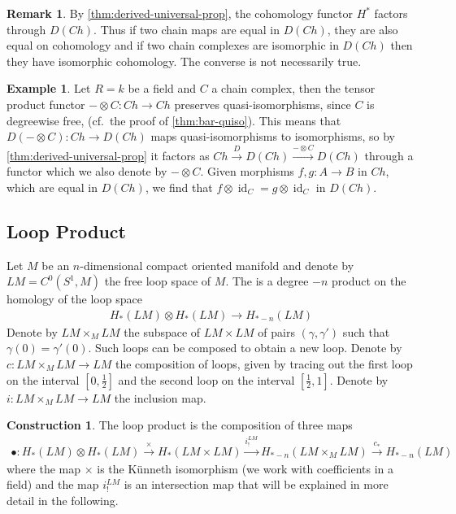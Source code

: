 \documentclass{scrartcl}
\let\emph\relax
\newcommand{\emphi}[1]{\index{#1}\emph{#1}}
\theoremstyle{plain}
\theoremstyle{definition}
\newtheorem{example}[theorem]{Example}
\newtheorem{remark}[theorem]{Remark}
\newtheorem{construction}[theorem]{Construction}
\let\xto\xrightarrow
\DeclareMathOperator{\id}{id}
\newcommand{\blank}{-}
\begin{document}
\begin{remark}
    By \cref{thm:derived-universal-prop}, the cohomology functor $H^*$ factors through $D(Ch)$. Thus if two chain maps are equal in $D(Ch)$, they are also equal on cohomology and if two chain complexes are isomorphic in $D(Ch)$ then they have isomorphic cohomology. The converse is not necessarily true.
\end{remark}

\begin{example}
    Let $R=k$ be a field and $C$ a chain complex, then the tensor product functor $\blank\otimes C\colon Ch\to Ch$ preserves quasi-isomorphisms, since $C$ is degreewise free, (cf.\ the proof of \cref{thm:bar-quiso}). This means that $D(\blank\otimes C)\colon Ch\to D(Ch)$ maps quasi-isomorphisms to isomorphisms, so by \cref{thm:derived-universal-prop} it factors as $Ch \xto{D} D(Ch)\xto{\blank\otimes C} D(Ch)$ through a functor which we also denote by $\blank\otimes C$. Given morphisms $f, g\colon A\to B$ in $Ch$, which are equal in $D(Ch)$, we find that $f\otimes \id_C = g\otimes\id_C$ in $D(Ch)$.
\end{example}


\subsection{Loop Product}\label{subsec:loop-product-classical}
Let $M$ be an $n$-dimensional compact oriented manifold and denote by $LM = C^0(S^1, M)$ the free loop space of $M$. The \emphi{loop product} is a degree $-n$ product on the homology of the loop space 
\begin{align*}
    H_*(LM)\otimes H_*(LM)\to H_{*-n}(LM)
\end{align*}
Denote by $LM\times_M LM$ the subspace of $LM\times LM$ of pairs $(\gamma, \gamma')$ such that $\gamma(0) = \gamma'(0)$. Such loops can be composed to obtain a new loop. Denote by $c\colon LM\times_M LM\to LM$ the composition of loops, given by tracing out the first loop on the interval $[0, \frac 12]$ and the second loop on the interval $[\frac 12, 1]$. Denote by $i\colon LM\times_M LM\to LM$ the inclusion map. 

\begin{construction}\label{constr:loop-product-classical}
The loop product is the composition of three maps
\begin{align*}
    \bullet\colon H_*(LM)\otimes H_*(LM)\xto{\times} H_{*}(LM\times LM)\xto{i_!^{LM}} H_{*-n}(LM\times_M LM)\xto{c_*} H_{*-n}(LM)
\end{align*}
where the map $\times$ is the Künneth isomorphism (we work with coefficients in a field) and the map $i_!^{LM}$ is an intersection map that will be explained in more detail in the following. 
\end{construction}
\end{document}
